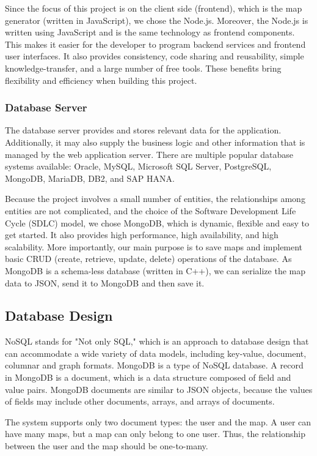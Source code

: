 Since the focus of this project is on the client side (frontend), which is the map generator (written in JavaScript), we chose the Node.js. Moreover, the Node.js is written using JavaScript and is the same technology as frontend components. This makes it easier for the developer to program backend services and frontend user interfaces. It also provides consistency, code sharing and reusability, simple knowledge-transfer, and a large number of free tools. These benefits bring flexibility and efficiency when building this project.

\subsubsection{Database Server}
\label{sec:Design>Architecture Design>Database Server}
The database server provides and stores relevant data for the application. Additionally, it may also supply the business logic and other information that is managed by the web application server. There are multiple popular database systems available: Oracle, MySQL, Microsoft SQL Server, PostgreSQL, MongoDB, MariaDB, DB2, and SAP HANA.

Because the project involves a small number of entities, the relationships among entities are not complicated, and the choice of the Software Development Life Cycle (SDLC) model, we chose MongoDB, which is dynamic, flexible and easy to get started. It also provides high performance, high availability, and high scalability. More importantly, our main purpose is to save maps and implement basic CRUD (create, retrieve, update, delete) operations of the database. As MongoDB is a schema-less database (written in C++), we can serialize the map data to JSON, send it to MongoDB and then save it.

\subsection{Database Design}
\label{sec:Design>Database Design}
NoSQL stands for "Not only SQL," which is an approach to database design that can accommodate a wide variety of data models, including key-value, document, columnar and graph formats. MongoDB is a type of NoSQL database. A record in MongoDB is a document, which is a data structure composed of field and value pairs. MongoDB documents are similar to JSON objects, because the values of fields may include other documents, arrays, and arrays of documents.

The system supports only two document types: the user and the map. A user can have many maps, but a map can only belong to one user. Thus, the relationship between the user and the map should be one-to-many.

